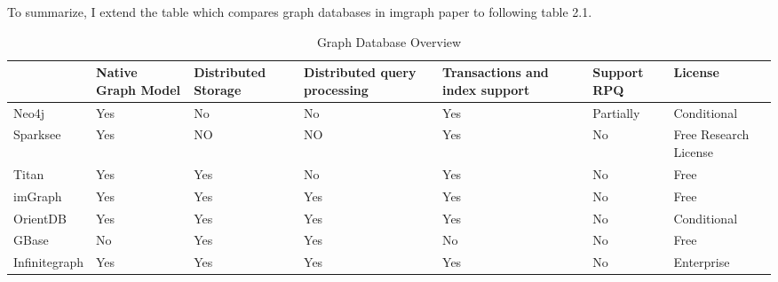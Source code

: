 To summarize, I extend the table which compares graph databases in imgraph paper\cite{imgraph} to following table 2.1.
\begin{table}[h!]
\scriptsize
\def\arraystretch{1.5}
\centering
\caption{Graph Database Overview}
\label{graph-database-overview}
\begin{tabular}{|l|m{5em}|m{5em}|m{5em}|m{5em}|m{5em}|m{5em}|}
\hline
 & Native Graph Model & Distributed Storage & Distributed query processing & Transactions and index support & Support RPQ & License \\
\hline
Neo4j & Yes & No & No & Yes & Partially & Conditional \\
\hline
Sparksee & Yes & NO & NO & Yes & No & Free Research License \\
\hline
Titan & Yes & Yes & No & Yes & No & Free \\
\hline
imGraph & Yes & Yes & Yes & Yes & No & Free \\
\hline
OrientDB & Yes & Yes & Yes & Yes & No & Conditional \\
\hline
GBase & No & Yes & Yes & No & No & Free \\
\hline
Infinitegraph & Yes & Yes & Yes & Yes & No & Enterprise\\
\hline
\end{tabular}
\end{table}
